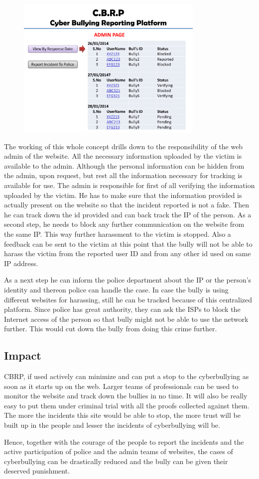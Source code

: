 \begin{figure}[h]
\centering
\includegraphics[width=0.8\textwidth]{images/Figure_4}
\caption{}
\label{Figure_4}
\end{figure}

The working of this whole concept drills down to the responsibility of the web admin of the website. All the necessary information uploaded by the victim is available to the admin. Although the personal information can be hidden from the admin, upon request, but rest all the information necessary for tracking is available for use. The admin is responsible for first of all verifying the information uploaded by the victim. He has to make sure that the information provided is actually present on the website so that the incident reported is not a fake. Then he can track down the id provided and can back track the IP of the person. As a second step, he needs to block any further communication on the website from the same IP. This way further harassment to the victim is stopped. Also a feedback can be sent to the victim at this point that the bully will not be able to harass the victim from the reported user ID and from any other id used on same IP address. 

As a next step he can inform the police department about the IP or the person’s identity and thereon police can handle the case. In case the bully is using different websites for harassing, still he can be tracked because of this centralized platform. Since police has great authority, they can ask the ISPs to block the Internet access of the person so that bully might not be able to use the network further. This would cut down the bully from doing this crime further. 

\subsection{Impact}
CBRP, if used actively can minimize and can put a stop to the cyberbullying as soon as it starts up on the web. Larger teams of professionals can be used to monitor the website and track down the bullies in no time. It will also be really easy to put them under criminal trial with all the proofs collected against them. The more the incidents this site would be able to stop, the more trust will be built up in the people and lesser the incidents of cyberbullying will be.

Hence, together with the courage of the people to report the incidents and the active participation of police and the admin teams of websites, the cases of cyberbullying can be drastically reduced and the bully can be given their deserved punishment.
